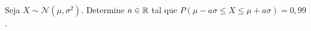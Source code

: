 %
%


\begin{exercicioBanco}[\valorquestao]
Seja \(X \sim \mathcal{N}(\mu,\sigma^{2})\). Determine \(a \in \mathbb{R}\) tal que \(P(\mu - a\sigma \le X \le \mu + a\sigma) = 0,99\).
%
\end{exercicioBanco}


